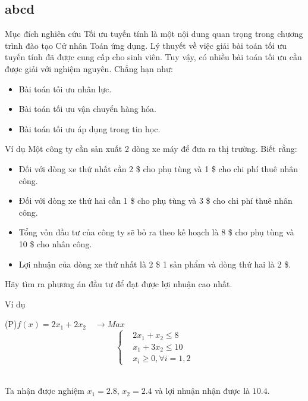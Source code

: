 \documentclass{beamer}
\begin{document}
\subsection{abcd}
\begin{frame}{Mục đích nghiên cứu}
    Tối ưu tuyến tính là một nội dung quan trọng trong chương trình đào tạo Cử nhân Toán ứng dụng. Lý thuyết về việc giải bài toán tối ưu tuyến tính đã được cung cấp cho sinh viên. Tuy vậy, có nhiều bài toán tối ưu cần được giải với nghiệm nguyên. Chẳng hạn như:
    \begin{itemize}
    \item Bài toán tối ưu nhân lực.
    \item Bài toán tối ưu vận chuyển hàng hóa.
    \item Bài toán tối ưu áp dụng trong tin học.
    \end{itemize}
\end{frame}
\begin{frame}{Ví dụ}
    Một công ty cần sản xuất 2 dòng xe máy để đưa ra thị trường. Biết rằng:
    \begin{itemize}
    \item Đối với dòng xe thứ nhất cần 2 \$ cho phụ tùng và 1 \$ cho chi phí thuê nhân công.
    \item Đối với dòng xe thứ hai cần 1 \$ cho phụ tùng và 3 \$ cho chi phí thuê nhân công.
    \item Tổng vốn đầu tư của công ty sẽ bỏ ra theo kế hoạch là 8 \$ cho phụ tùng và 10 \$ cho nhân công.
    \item Lợi nhuận của dòng xe thứ nhất là 2 \$ 1 sản phẩm và dòng thứ hai là 2 \$.
    \end{itemize}    
    Hãy tìm ra phương án đầu tư để đạt được lợi nhuận cao nhất.
\end{frame}
\begin{frame}{Ví dụ}
    \begin{center}                    
        \big(P\big)\quad $f(x)=2x_1+2x_2\quad \longrightarrow Max$\\
        \[\left\{\begin{aligned}
            &2x_1+x_2 \leq  8 \\
            &x_1+3x_2 \leq 10 \\
            &x_i\geq 0,\forall i=1,2
        \end{aligned}\right.\]\\
        \end{center}  
        Ta nhận được nghiệm $x_1=2.8$, $x_2=2.4$ và lợi nhuận nhận được là $10.4$.    
  
\end{frame}
\end{document}
